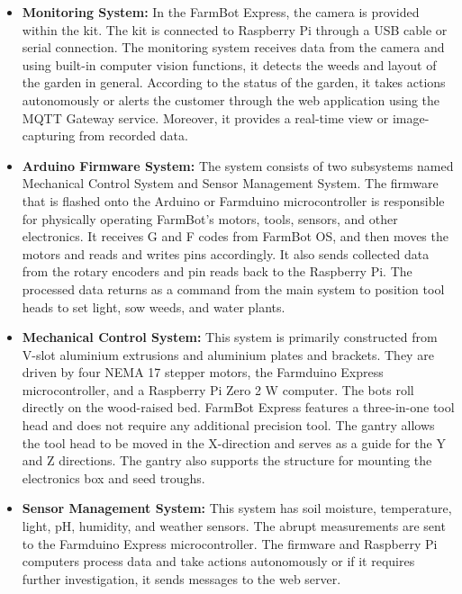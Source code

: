 \begin{itemize}

    \item \textbf{Monitoring System:} In the FarmBot Express, the camera is provided within the kit. The kit is connected to Raspberry Pi through a USB cable or serial connection. The monitoring system receives data from the camera and using built-in computer vision functions, it detects the weeds and layout of the garden in general. According to the status of the garden, it takes actions autonomously or alerts the customer through the web application using the MQTT Gateway service. Moreover, it provides a real-time view or image-capturing from recorded data.

    \item \textbf{Arduino Firmware System:} The system consists of two subsystems named Mechanical Control System and Sensor Management System. The firmware that is flashed onto the Arduino or Farmduino microcontroller is responsible for physically operating FarmBot’s motors, tools, sensors, and other electronics. It receives G and F codes from FarmBot OS, and then moves the motors and reads and writes pins accordingly. It also sends collected data from the rotary encoders and pin reads back to the Raspberry Pi. The processed data returns as a command from the main system to position tool heads to set light, sow weeds, and water plants.

    \item \textbf{Mechanical Control System:} This system is primarily constructed from V-slot aluminium extrusions and aluminium plates and brackets. They are driven by four NEMA 17 stepper motors, the Farmduino Express microcontroller, and a Raspberry Pi Zero 2 W computer.
    The bots roll directly on the wood-raised bed. FarmBot Express features a three-in-one tool head and does not require any additional precision tool. The gantry allows the tool head to be moved in the X-direction and serves as a guide for the Y and Z directions. The gantry also supports the structure for mounting the electronics box and seed troughs.

    \item \textbf{Sensor Management System:} This system has soil moisture, temperature, light, pH, humidity, and weather sensors. The abrupt measurements are sent to the Farmduino Express microcontroller. The firmware and Raspberry Pi computers process data and take actions autonomously
    or if it requires further investigation, it sends messages to the web server.


\end{itemize}
